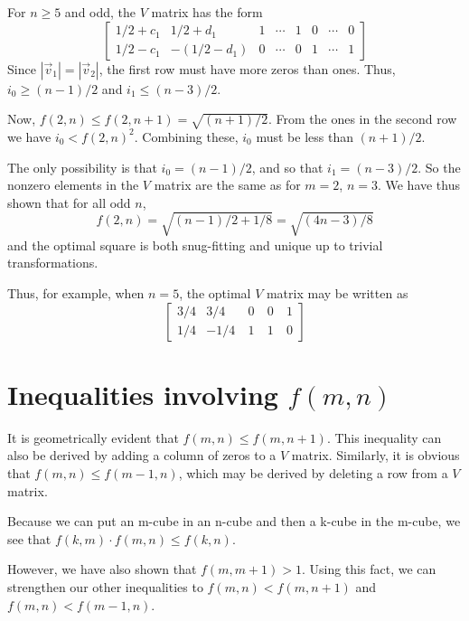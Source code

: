 For $n \geq 5$ and odd, the $V$ matrix has the form
\begin{equation*}
\left[
\begin{array}{cc|ccc|ccc}
1/2 + c_1 &   1/2 + d_1  & 1 & \cdots & 1 & 0 & \cdots & 0 \\
1/2 - c_1 & -(1/2 - d_1) & 0 & \cdots & 0 & 1 & \cdots & 1 
\end{array}
\right]
\end{equation*}
Since $|\vec{v}_1| = |\vec{v}_2|$, the first row must have more zeros than
ones.  Thus, $i_0 \geq (n-1)/2$ and $i_1 \leq (n-3)/2$.

Now, $f(2,n) \leq f(2,n+1) = \sqrt{(n+1)/2}$.  From the ones in the second row
we have $i_0 < f(2,n)^2$.  Combining these, $i_0$ must be less than $(n+1)/2$.

The only possibility is that $i_0 = (n-1)/2$, and so that $i_1 = (n-3)/2$.  So
the nonzero elements in the $V$ matrix are the same as for $m = 2$, $n = 3$.
We have thus shown that for all odd $n$,
\begin{equation*}
f(2,n) = \sqrt{(n-1)/2 + 1/8} = \sqrt{(4n-3)/8}
\end{equation*}
and the optimal square is both snug-fitting and unique up to trivial
transformations.

Thus, for example, when $n = 5$, the optimal $V$ matrix may be written as
\begin{equation*}
\left[
\begin{array}{rrrrr}
3/4 &  3/4 & ~0 & ~0 & ~1 \\
1/4 & -1/4 & ~1 & ~1 & ~0
\end{array}
\right]
\end{equation*}

\section*{Inequalities involving $f(m,n)$}

It is geometrically evident that $f(m,n) \leq f(m,n+1)$.  This inequality can
also be derived by adding a column of zeros to a $V$ matrix.  Similarly, it is
obvious that $f(m,n) \leq f(m-1,n)$, which may be derived by deleting a row
from a $V$ matrix.

Because we can put an m-cube in an n-cube and then a k-cube in the m-cube,
we see that $f(k,m) \cdot f(m,n) \leq f(k,n)$.

However, we have also shown that $f(m,m+1) > 1$.  Using this fact, we can
strengthen our other inequalities to $f(m,n) < f(m,n+1)$ and $f(m,n) <
f(m-1,n)$.

